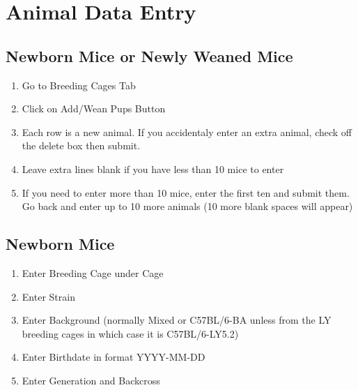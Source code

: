 \documentclass[letterpaper,10pt,english]{sphinxmanual}
\begin{document}
\chapter{Animal Data Entry}
\label{usage:animal-data-entry}\label{usage::doc}

\section{Newborn Mice or Newly Weaned Mice}
\label{usage:newborn-mice-or-newly-weaned-mice}\begin{enumerate}
\item {} 
Go to Breeding Cages Tab


\item {} 
Click on Add/Wean Pups Button


\item {} 
Each row is a new animal.  If you accidentaly enter an extra animal, check off the delete box then submit.


\item {} 
Leave extra lines blank if you have less than 10 mice to enter


\item {} 
If you need to enter more than 10 mice, enter the first ten and submit them.  Go back and enter up to 10 more animals (10 more blank spaces will appear)


\end{enumerate}


\section{Newborn Mice}
\label{usage:newborn-mice}\begin{enumerate}
\item {} 
Enter Breeding Cage under Cage


\item {} 
Enter Strain


\item {} 
Enter Background (normally Mixed or C57BL/6-BA unless from the LY breeding cages in which case it is C57BL/6-LY5.2)


\item {} 
Enter Birthdate in format YYYY-MM-DD


\item {} 
Enter Generation and Backcross


\end{enumerate}
\end{document}

